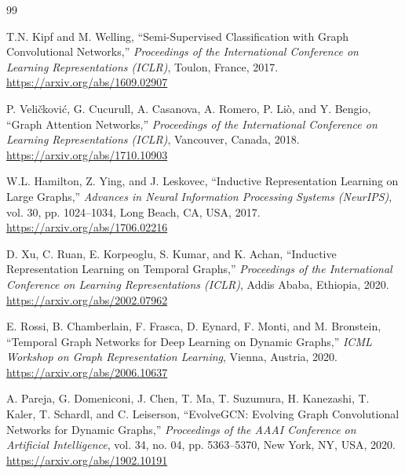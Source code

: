 

\begin{thebibliography}{99}


T.N. Kipf and M. Welling,
``Semi-Supervised Classification with Graph Convolutional Networks,''
\emph{Proceedings of the International Conference on Learning Representations (ICLR)},
Toulon, France, 2017.
\url{https://arxiv.org/abs/1609.02907}

P. Veli\v{c}kovi\'{c}, G. Cucurull, A. Casanova, A. Romero, P. Li\`{o}, and Y. Bengio,
``Graph Attention Networks,''
\emph{Proceedings of the International Conference on Learning Representations (ICLR)},
Vancouver, Canada, 2018.
\url{https://arxiv.org/abs/1710.10903}

W.L. Hamilton, Z. Ying, and J. Leskovec,
``Inductive Representation Learning on Large Graphs,''
\emph{Advances in Neural Information Processing Systems (NeurIPS)},
vol. 30, pp. 1024--1034, Long Beach, CA, USA, 2017.
\url{https://arxiv.org/abs/1706.02216}


D. Xu, C. Ruan, E. Korpeoglu, S. Kumar, and K. Achan,
``Inductive Representation Learning on Temporal Graphs,''
\emph{Proceedings of the International Conference on Learning Representations (ICLR)},
Addis Ababa, Ethiopia, 2020.
\url{https://arxiv.org/abs/2002.07962}

E. Rossi, B. Chamberlain, F. Frasca, D. Eynard, F. Monti, and M. Bronstein,
``Temporal Graph Networks for Deep Learning on Dynamic Graphs,''
\emph{ICML Workshop on Graph Representation Learning},
Vienna, Austria, 2020.
\url{https://arxiv.org/abs/2006.10637}

A. Pareja, G. Domeniconi, J. Chen, T. Ma, T. Suzumura, H. Kanezashi, T. Kaler, T. Schardl, and C. Leiserson,
``EvolveGCN: Evolving Graph Convolutional Networks for Dynamic Graphs,''
\emph{Proceedings of the AAAI Conference on Artificial Intelligence},
vol. 34, no. 04, pp. 5363--5370, New York, NY, USA, 2020.
\url{https://arxiv.org/abs/1902.10191}


\end{thebibliography}
